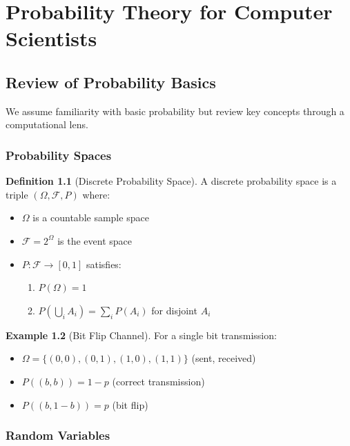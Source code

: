 \documentclass[11pt,twoside,openright]{book}
\theoremstyle{definition}
\newtheorem{definition}{Definition}[chapter]
\newtheorem{example}[definition]{Example}
\theoremstyle{plain}
\theoremstyle{remark}
\begin{document}
\chapter{Probability Theory for Computer Scientists}
\label{ch:probability}

\section{Review of Probability Basics}

We assume familiarity with basic probability but review key concepts through a computational lens.

\subsection{Probability Spaces}

\begin{definition}[Discrete Probability Space]
A discrete probability space is a triple $(\Omega, \mathcal{F}, P)$ where:
\begin{itemize}
    \item $\Omega$ is a countable sample space
    \item $\mathcal{F} = 2^\Omega$ is the event space
    \item $P: \mathcal{F} \to [0,1]$ satisfies:
    \begin{enumerate}
        \item $P(\Omega) = 1$
        \item $P(\bigcup_{i} A_i) = \sum_i P(A_i)$ for disjoint $A_i$
    \end{enumerate}
\end{itemize}
\end{definition}

\begin{example}[Bit Flip Channel]
For a single bit transmission:
\begin{itemize}
    \item $\Omega = \{(0,0), (0,1), (1,0), (1,1)\}$ (sent, received)
    \item $P((b, b)) = 1-p$ (correct transmission)
    \item $P((b, 1-b)) = p$ (bit flip)
\end{itemize}
\end{example}

\subsection{Random Variables}
\end{document}
